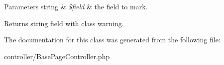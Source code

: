 \begin{DoxyParams}[1]{Parameters}
string & {\em \$field} & the field to mark. \\
\hline
\end{DoxyParams}
\begin{DoxyReturn}{Returns}
string field with class warning. 
\end{DoxyReturn}


The documentation for this class was generated from the following file\+:\begin{DoxyCompactItemize}
\item 
controller/Base\+Page\+Controller.\+php\end{DoxyCompactItemize}
